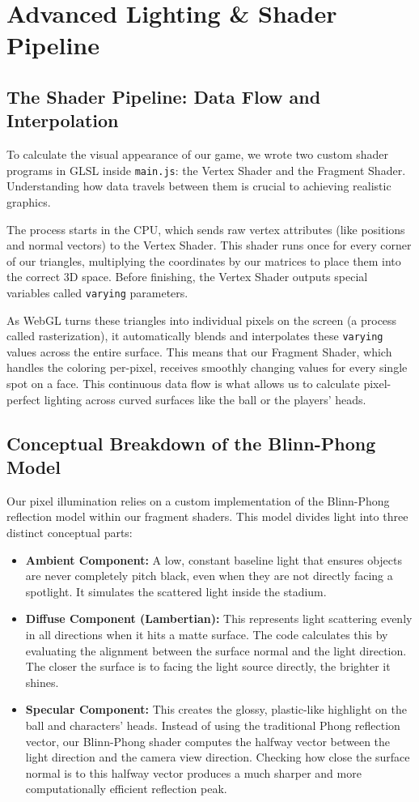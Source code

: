 \chapter{Advanced Lighting \& Shader Pipeline}

\section{The Shader Pipeline: Data Flow and Interpolation}
To calculate the visual appearance of our game, we wrote two custom shader programs in GLSL inside \texttt{main.js}: the Vertex Shader and the Fragment Shader. Understanding how data travels between them is crucial to achieving realistic graphics.

The process starts in the CPU, which sends raw vertex attributes (like positions and normal vectors) to the Vertex Shader. This shader runs once for every corner of our triangles, multiplying the coordinates by our matrices to place them into the correct 3D space. Before finishing, the Vertex Shader outputs special variables called \texttt{varying} parameters. 

As WebGL turns these triangles into individual pixels on the screen (a process called rasterization), it automatically blends and interpolates these \texttt{varying} values across the entire surface. This means that our Fragment Shader, which handles the coloring per-pixel, receives smoothly changing values for every single spot on a face. This continuous data flow is what allows us to calculate pixel-perfect lighting across curved surfaces like the ball or the players' heads.

\section{Conceptual Breakdown of the Blinn-Phong Model}
Our pixel illumination relies on a custom implementation of the Blinn-Phong reflection model within our fragment shaders. This model divides light into three distinct conceptual parts:
\begin{itemize}
    \item \textbf{Ambient Component:} A low, constant baseline light that ensures objects are never completely pitch black, even when they are not directly facing a spotlight. It simulates the scattered light inside the stadium.
    \item \textbf{Diffuse Component (Lambertian):} This represents light scattering evenly in all directions when it hits a matte surface. The code calculates this by evaluating the alignment between the surface normal and the light direction. The closer the surface is to facing the light source directly, the brighter it shines.
    \item \textbf{Specular Component:} This creates the glossy, plastic-like highlight on the ball and characters' heads. Instead of using the traditional Phong reflection vector, our Blinn-Phong shader computes the halfway vector between the light direction and the camera view direction. Checking how close the surface normal is to this halfway vector produces a much sharper and more computationally efficient reflection peak.
\end{itemize}


